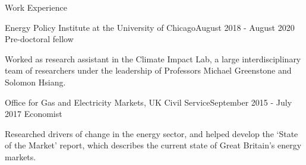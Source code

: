 \documentclass{resume} %
\begin{document}
\begin{rSection}{Work Experience}

\begin{rSubsection}{Energy Policy Institute at the University of Chicago}{August 2018 - August 2020} {Pre-doctoral fellow} 

    \item Worked as research assistant in the Climate Impact Lab, a large interdisciplinary team of researchers under the leadership of Professors Michael Greenstone and Solomon Hsiang. 
\end{rSubsection}

\begin{rSubsection}{Office for Gas and Electricity Markets, UK Civil Service}{September 2015 - July 2017} {Economist} 

    \item Researched drivers of change in the energy sector, and helped develop the `State of the Market' report, which describes the current state of Great Britain's energy markets. 
    
\end{rSubsection}

\end{rSection}



\end{document}
